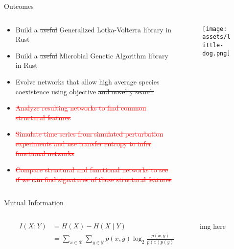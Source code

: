 \documentclass{cubeamer}
\begin{document}
\begin{frame}{Outcomes}
    \begin{columns}
        \begin{column}{0.7\textwidth}
            \begin{itemize}
                \item Build a \sout{useful} Generalized Lotka-Volterra library in Rust
                \item Build a \sout{useful} Microbial Genetic Algorithm library in Rust
                \item Evolve networks that allow high average species coexistence using objective \sout{and novelty search}
                \item \textcolor{red}{\sout{Analyze resulting networks to find common structural features}}
                \item \textcolor{red}{\sout{Simulate time series from simulated perturbation experiments and use transfer entropy to infer functional networks}}
                \item \textcolor{red}{\sout{Compare structural and functional networks to see if we can find signatures of those structural features}}
            \end{itemize}
        \end{column}
        \begin{column}{0.3\textwidth}
            \begin{figure*}
                \texttt{[image: assets/little-dog.png]}
            \end{figure*}
        \end{column}
    \end{columns}
\end{frame}

\begin{frame}{Mutual Information}
    \begin{columns}
        \begin{column}{0.4\textwidth}
            \begin{align*}
                I(X:Y) &= H(X) - H(X \mid Y) \\
                       &= \sum_{x \in \mathcal{X}} \sum_{y \in \mathcal{Y}} p(x,y) \log_2 \frac{p(x,y)}{p(x)p(y)}
            \end{align*}
        \end{column}
        \begin{column}{0.6\textwidth}
            img here
        \end{column}
    \end{columns}
\end{frame}
\end{document}
